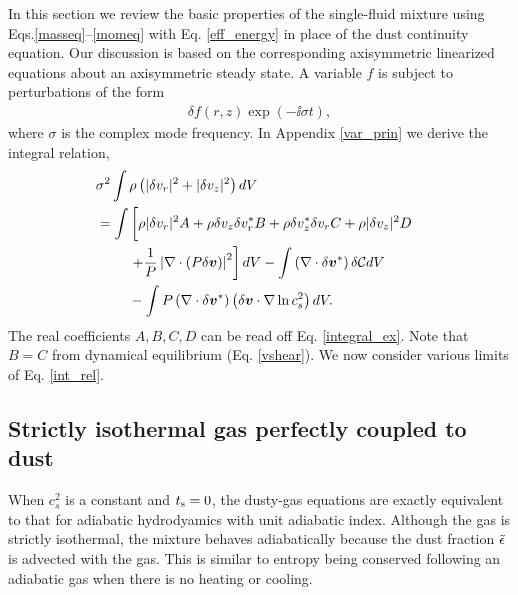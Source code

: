 In this section we review the basic properties of the 
single-fluid mixture using Eqs.\ref{masseq}--\ref{momeq} with 
Eq. \ref{eff_energy} in place of the dust continuity equation. Our
discussion is based on the corresponding axisymmetric linearized
equations about an axisymmetric steady state. A variable $f$ is
subject to perturbations of the form 
\begin{align}
  \delta f(r,z)\exp{\left(-\ii\sigma t\right)},
\end{align}
where $\sigma$ is the complex mode frequency. In Appendix
\ref{var_prin} we derive the integral relation,  
\begin{align}
&  \sigma^2\int\rho\left(|\dd v_r|^2 + |\dd v_z|^2\right)dV \notag\\
&= \int\left[ \rho
  |\dd v_r|^2A + \rho  \dd v_z \dd v_r^* B + \rho \dd v_z^*\dd v_r C +
  \rho |\dd v_z|^2 D\phantom{\frac{1}{1}}\right. \notag\\
&\phantom{===}  \left. + \frac{1}{P}\left|\nabla\cdot\left(P\dd
  \bm{v}\right)\right|^2\right]dV  -\int \left(\nabla\cdot\dd\bm{v}^*\right)\dd\mathcal{C}dV \notag\\
&\phantom{===}
- \int P
  \left(\nabla\cdot\dd\bm{v}^*\right)\left(\dd\bm{v}\cdot\nabla\ln{c_s^2}\right)dV.\label{int_rel}
\end{align} 
The real coefficients $A,B,C,D$ can be read off 
Eq. \ref{integral_ex}. Note that $B=C$ from dynamical equilibrium
(Eq. \ref{vshear}). We now consider various limits of
Eq. \ref{int_rel}.    


\subsection{Strictly isothermal gas perfectly coupled to dust}   
When $c_s^2$ is a constant and $t_\mathrm{s}=0$, the dusty-gas equations are
exactly equivalent to that for adiabatic hydrodyamics with unit adiabatic
index. Although the gas is strictly isothermal, the mixture behaves 
adiabatically because the dust fraction $\tilde{\epsilon}$ is advected with 
the gas. This is similar to entropy being conserved following an
adiabatic gas when there is no heating or cooling.  

